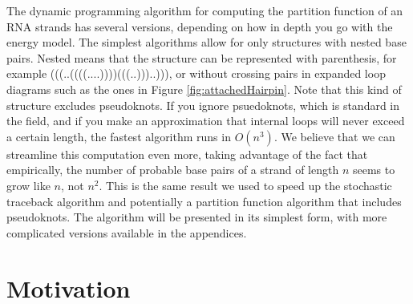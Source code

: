 The dynamic programming algorithm for computing the partition function
of an RNA strands has several versions, depending on how in depth you
go with the energy model. The simplest algorithms allow for only
structures with nested base pairs. Nested means that the structure can
be represented with parenthesis, for example
(((..((((....))))(((..)))..))), or without crossing pairs in expanded
loop diagrams such as the ones in Figure
\ref{fig:attachedHairpin}. Note that this kind of structure excludes
pseudoknots.  If you ignore psuedoknots, which is standard in the
field, and if you make an approximation that internal loops will never
exceed a certain length, the fastest algorithm runs in $O(n^3)$. We
believe that we can streamline this computation even more, taking
advantage of the fact that empirically, the number of probable base
pairs of a strand of length $n$ seems to grow like $n$, not
$n^2$. This is the same result we used to speed up the stochastic
traceback algorithm and potentially a partition function algorithm
that includes pseudoknots. The algorithm will be presented in its
simplest form, with more complicated versions available in the
appendices.

\section{Motivation}

